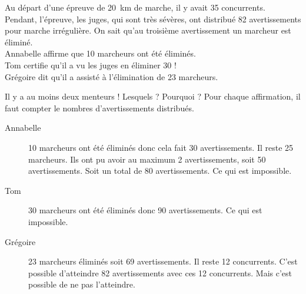 Au départ d'une épreuve de 20~km de marche, il y avait 35 concurrents.\\Pendant, l'épreuve, les juges, qui sont très sévères, ont distribué 82 avertissements pour marche irrégulière. On sait qu'au troisième avertissement un marcheur est éliminé.\\Annabelle affirme que 10 marcheurs ont été éliminés.\\Tom certifie qu'il a vu les juges en éliminer 30 !\\Grégoire dit qu'il a assisté à l'élimination de 23 marcheurs.
\par Il y a au moins deux menteurs ! Lesquels ? Pourquoi ?
Pour chaque affirmation, il faut compter le nombres d'avertissements distribués.
\begin{description}
\item[Annabelle] 10 marcheurs ont été éliminés donc cela fait 30 avertissements. Il reste 25 marcheurs. Ils ont pu avoir au maximum 2 avertissements, soit 50 avertissements. Soit un total de 80 avertissements. Ce qui est impossible.
\item[Tom] 30 marcheurs ont été éliminés donc 90 avertissements. Ce qui est impossible.
\item[Grégoire] 23 marcheurs éliminés soit 69 avertissements. Il reste 12 concurrents. C'est possible d'atteindre 82 avertissements avec ces 12 concurrents. Mais c'est possible de ne pas l'atteindre.
\end{description}
